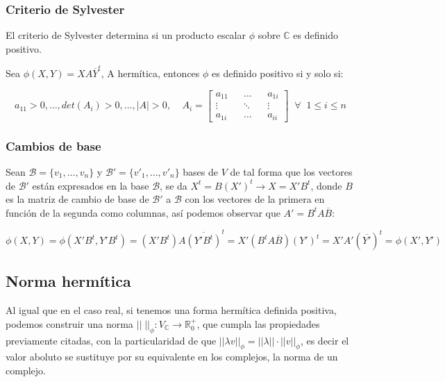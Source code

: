\documentclass{preset}
\newcommand{\compconj}[1]{%
  \overline{#1}%
}
\begin{document}
\subsubsection{Criterio de Sylvester}
El criterio de Sylvester determina si un producto escalar $\phi$ sobre $\mathbb{C}$ es definido positivo.
 
\noindent Sea $\phi(X,Y)=XA\compconj{Y}^t$, A hermítica, entonces $\phi$ es definido positivo si y solo si:

\vspace{-20pt}
\[a_{11}>0, \dots ,det(A_{i})>0, \dots,|A|>0, \;\;\;\; A_{i}=
    \left[\begin{matrix}
    a_{11} && \dots && a_{1i} \\
    \vdots && \ddots && \vdots  \\
    a_{1i} && \dots && a_{ii}
    \end{matrix}\right]
    \;\; \forall \;\; 1\leq i\leq n
    \]


\vspace{-35pt}
\subsubsection{Cambios de base}
Sean $\mathcal{B}=\{v_1,\dots,v_n\}$ y $\mathcal{B}'=\{v'_1,\dots,v'_n\}$ bases de $V$ de tal forma que los vectores de $\mathcal{B}'$ están expresados en la base $\mathcal{B}$, se da $X^t=B(X')^t\rightarrow X=X'B^t$, donde $B$ es la matriz de cambio de base de $\mathcal{B}'$ a $\mathcal{B}$ con los vectores de la primera en función de la segunda como columnas, así podemos observar que $A'=B^tA\compconj{B}$:

\vspace{-25pt}  
\[ \phi(X,Y)=\phi(X'B^t,Y'B^t)=(X'B^t)A\compconj{(Y'B^t)}^t=X'(B^tA\compconj{B})(Y')^t=X'A'(\compconj{Y'})^t=\phi(X',Y')\]

\vspace{-25pt}
\subsection{Norma hermítica}
Al igual que en el caso real, si tenemos una forma hermítica definida positiva, podemos construir una norma $||\;||_\phi: V_{\mathbb{C}}\rightarrow \mathbb{R}^+_0$, que cumpla las propiedades previamente citadas, con la particularidad de que $||\lambda v||_\phi=||\lambda||\cdot||v||_\phi$, es decir el valor aboluto se sustituye por su equivalente en los complejos, la norma de un complejo.
\end{document}
